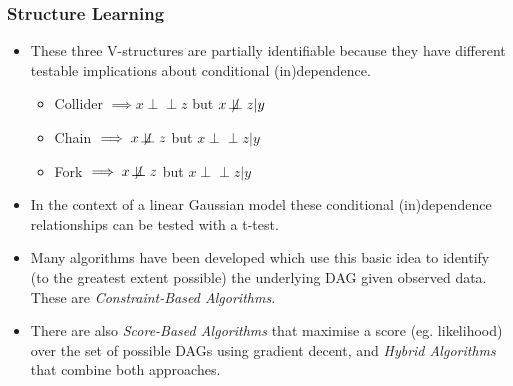 \documentclass{beamer}
\def\indep{\perp \!\!\! \perp}
\begin{document}
\begin{frame}
    \frametitle{Structure Learning}
    \begin{itemize}
        \item These three V-structures are partially identifiable because they have different testable implications about conditional (in)dependence.
        \begin{itemize}
            \item Collider $\implies x \indep z$ but $x \not\!\indep z | y$
            \item Chain $\implies x \not\!\indep z$ but $x \indep z | y$
            \item Fork $\implies x \not\!\indep z$ but $x \indep z | y$
        \end{itemize}
        \item In the context of a linear Gaussian model these conditional (in)dependence relationships can be tested with a t-test.
        \item Many algorithms have been developed which use this basic idea to identify (to the greatest extent possible) the underlying DAG given observed data. These are \textit{Constraint-Based Algorithms}.
        \item There are also \textit{Score-Based Algorithms} that maximise a score (eg. likelihood) over the set of possible DAGs using gradient decent, and \textit{Hybrid Algorithms} that combine both approaches.
    \end{itemize}
\end{frame}
\end{document}
